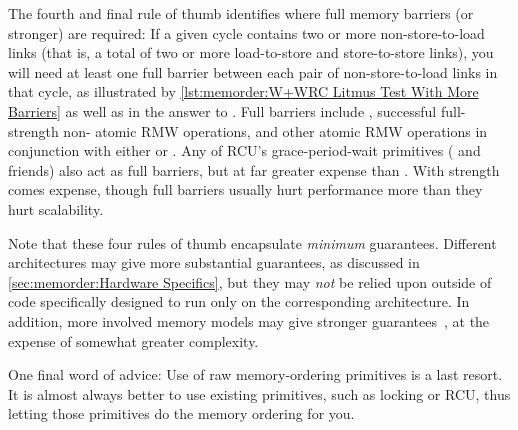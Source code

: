 \QuickQuizEnd

The fourth and final rule of thumb identifies where full memory barriers
(or stronger) are required:
If a given cycle contains two or more non-store-to-load links (that is,
a total of two or more load-to-store and store-to-store links), you will
need at least one full barrier between each pair of non-store-to-load
links in that cycle, as illustrated by
\cref{lst:memorder:W+WRC Litmus Test With More Barriers}
as well as in the answer to
\QuickQuizARef{\MemorderQQLitmusTestR}.
Full barriers include , successful full-strength non-
atomic RMW operations, and other atomic RMW operations in conjunction with
either  or .
Any of RCU's grace-period-wait primitives ( and
friends) also act as full barriers, but at far greater expense than
.
With strength comes expense, though full barriers
usually hurt performance more than they hurt scalability.

Note that these four rules of thumb encapsulate \emph{minimum} guarantees.
Different architectures may give
more substantial guarantees,
as discussed in \cref{sec:memorder:Hardware Specifics},
but they may \emph{not}
be relied upon outside of code specifically designed to run only on
the corresponding architecture.
In addition, more involved memory models may give stronger
guarantees~\cite{Alglave:2018:FSC:3173162.3177156}, at the
expense of somewhat greater complexity.

One final word of advice: Use of raw memory-ordering primitives is
a last resort.
It is almost always better to use existing primitives, such as locking
or RCU, thus letting those primitives do the memory ordering for you.

